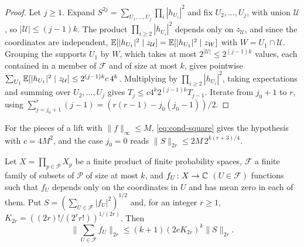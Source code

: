 \begin{proof}
Let $j\ge1$. Expand $S^{2j}=\sum_{U_1,\dots,U_j}\prod_i|h_{U_i}|^2$ and fix
$U_2,\dots,U_j$, with union $\mathcal U$, so $|\mathcal U|\le(j-1)k$. The
product $\prod_{i\ge2}|h_{U_i}|^2$ depends only on $z_{\mathcal U}$, and since the
coordinates are independent,
$\mathbb E[|h_{U_1}|^2\mid z_{\mathcal U}]=\mathbb E[|h_{U_1}|^2\mid z_W]$ with
$W=U_1\cap\mathcal U$. Grouping the supports $U_1$ by $W$, which takes at most
$2^{|\mathcal U|}\le2^{(j-1)k}$ values, each contained in a member of
$\mathcal F$ and of size at most $k$, gives pointwise
$\sum_{U_1}\mathbb E[|h_{U_1}|^2\mid z_{\mathcal U}]\le2^{(j-1)k}c\,4^k$. Multiplying by
$\prod_{i\ge2}|h_{U_i}|^2$, taking expectations and summing over
$U_2,\dots,U_j$ gives $T_j\le c4^k2^{(j-1)k}T_{j-1}$. Iterate from $j_0+1$ to
$r$, using $\sum_{j=j_0+1}^r(j-1)=(r(r-1)-j_0(j_0-1))/2$.
\end{proof}

For the pieces of a lift with $\|f\|_\infty\le M$, \eqref{eq:cond-square} gives
the hypothesis with $c=4M^2$, and the case $j_0=0$ reads
$\|S\|_{2r}\le2M\,2^{k(r+3)/4}$.

\begin{lemma}\label{lem:lift:decoupling}
Let $X=\prod_{p\in\mathcal P}X_p$ be a finite product of finite probability
spaces, $\mathcal F$ a finite family of subsets of $\mathcal P$ of size at most
$k$, and $f_U\colon X\to\mathbb C$ $(U\in\mathcal F)$ functions such that $f_U$
depends only on the coordinates in $U$ and has mean zero in each of them. Put
$S=(\sum_{U\in\mathcal F}|f_U|^2)^{1/2}$ and, for an integer $r\ge1$,
$K_{2r}=((2r)!/(2^rr!))^{1/(2r)}$. Then
\[
 \Big\|\sum_{U\in\mathcal F}f_U\Big\|_{2r}\le(k+1)(2eK_{2r})^k\|S\|_{2r}.
\]
\end{lemma}

